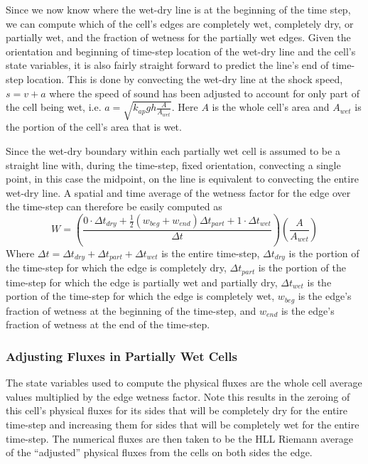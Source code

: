 \documentclass[letterpaper,10pt]{article}
\begin{document}
Since we now know where the wet-dry line is at the beginning of the 
time step, we can compute which of the cell's edges are completely 
wet, completely dry, or partially wet, and the fraction of wetness for 
the partially wet edges.  Given the orientation and beginning of 
time-step location of the wet-dry line and the cell's state variables, 
it is also fairly straight forward to predict the line's end of 
time-step location.  This is done by convecting the wet-dry line at 
the shock speed, $s=v+a$ where the speed of sound has been adjusted 
to account for only part of the cell being wet, i.e. 
$a=\sqrt{k_{ap}gh\frac{A}{A_{wet}}}$.  Here $A$ is the whole cell's 
area and $A_{wet}$ is the portion of the cell's area that is wet.  \newline

Since the wet-dry boundary within each partially wet cell is assumed 
to be a straight line with, during the time-step, fixed orientation, 
convecting a single point, in this case the midpoint, on the line is 
equivalent to convecting the entire wet-dry line.  A spatial and time 
average of the wetness factor for the edge over the time-step can 
therefore be easily computed as
\begin{equation}
W=\left(\frac{0\cdot\Delta t_{dry} +\frac{1}{2}(w_{beg}+w_{end})\Delta t_{part}+1\cdot\Delta t_{wet}}{\Delta t}\right) \left(\frac{A}{A_{wet}}\right)
\label{wetnessfactor}
\end{equation}
Where $\Delta t=\Delta t_{dry}+\Delta t_{part}+\Delta t_{wet}$ is the 
entire time-step, $\Delta t_{dry}$ is the portion of the time-step for 
which the edge is completely dry, $\Delta t_{part}$ is the portion of 
the time-step for which the edge is partially wet and partially dry, 
$\Delta t_{wet}$ is the portion of the time-step for which the edge is 
completely wet, $w_{beg}$ is the edge's fraction of wetness at the 
beginning of the time-step, and $w_{end}$ is the edge's fraction of 
wetness at the end of the time-step.\newline

\subsubsection{Adjusting Fluxes in Partially Wet Cells} \label{adjustfluxes}

The state variables used to compute the physical fluxes are the whole
cell average values multiplied by the edge wetness factor.  Note this 
results in the zeroing of this cell's physical fluxes for its sides 
that will be completely dry for the entire time-step and increasing 
them for sides that will be completely wet for the entire time-step.   
The numerical fluxes are then taken to be the HLL Riemann average of 
the ``adjusted'' physical fluxes from the cells on both sides the edge.  \newline
\end{document}
